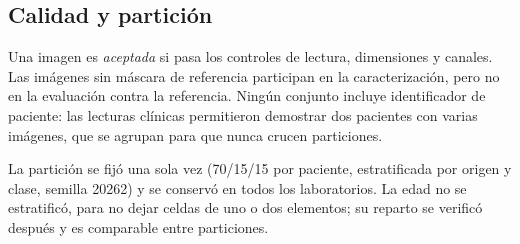 \subsection{Calidad y partición}

Una imagen es \emph{aceptada} si pasa los controles de lectura, dimensiones y
canales. Las imágenes sin máscara de referencia participan en la caracterización,
pero no en la evaluación contra la referencia. Ningún conjunto incluye
identificador de paciente: las lecturas clínicas permitieron demostrar dos pacientes
con varias imágenes, que se agrupan para que nunca crucen particiones.

La partición se fijó una sola vez (70/15/15 por paciente, estratificada por origen
y clase, semilla 20262) y se conservó en todos los laboratorios. La edad no se
estratificó, para no dejar celdas de uno o dos elementos; su reparto se verificó
después y es comparable entre particiones.

